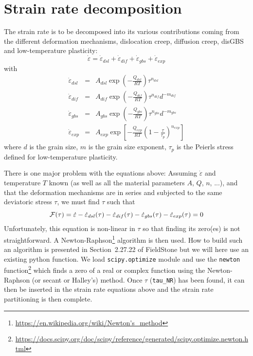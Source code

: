 \documentclass[a4paper]{article}
\begin{document}
\section{Strain rate decomposition \label{sec:visc}}

The strain rate is to be decomposed into its various contributions 
coming from the different deformation mechanisms, dislocation creep,
diffusion creep, disGBS and low-temperature plasticity:
\[
\dot\varepsilon = \dot\varepsilon_{dsl} + \dot\varepsilon_{dif} + 
\dot\varepsilon_{gbs} + \dot\varepsilon_{exp} 
\]
with
\begin{eqnarray}
\dot{\varepsilon}_{dsl}&=&A_{dsl}\exp\left(-\frac{Q_{dsl}}{RT} \right) \tau^{n_{dsl}}  \\
\dot{\varepsilon}_{dif}&=&A_{dif}\exp\left(-\frac{Q_{dif}}{RT} \right) \tau^{n_{dif}} d^{-m_{dif}} \\
\dot{\varepsilon}_{gbs}&=&A_{gbs}\exp\left(-\frac{Q_{gbs}}{RT} \right) \tau^{n_{gbs}} d^{-m_{gbs}} \\
\dot{\varepsilon}_{exp}&=&A_{exp}\exp\left[-\frac{Q_{exp}}{RT} \left(1 -\frac{\tau}{\tau_p}\right)^{n_{exp}} \right]   
\end{eqnarray}
where $d$ is the grain size, $m$ is the grain size exponent, $\tau_p$ is the Peierls stress defined
for low-temperature plasticity.


There is one major problem with the equations above:
Assuming $\dot\varepsilon$ and temperature $T$ known (as well as all the material parameters $A$, $Q$, $n$, ...),
and that the deformation mechanisms are in series and subjected to the same deviatoric stress $\tau$,
we must find $\tau$ such that
\[
{\cal F}(\tau) = \dot\varepsilon -  \dot\varepsilon_{dsl}(\tau) 
-\dot\varepsilon_{dif}(\tau) -\dot\varepsilon_{gbs}(\tau) - \dot\varepsilon_{exp}(\tau) =0
\]
Unfortunately, this equation is non-linear in $\tau$ so that finding its zero(es) is not
straightforward. A Newton-Raphson\footnote{\url{https://en.wikipedia.org/wiki/Newton's_method}}
algorithm is then used. How to build such an algorithm is presented in Section~2.27.22 of FieldStone
but we will here use an existing python function.
We load \lstinline{scipy.optimize} module and use the \lstinline{newton} function\footnote{\url{
https://docs.scipy.org/doc/scipy/reference/generated/scipy.optimize.newton.html}}
which finds a zero of a real or complex function using the Newton-Raphson (or secant or Halley’s) method.
Once $\tau$ (\lstinline{tau_NR}) has been found, it can then be inserted in the strain rate equations above and
the strain rate partitioning is then complete.
\end{document}
